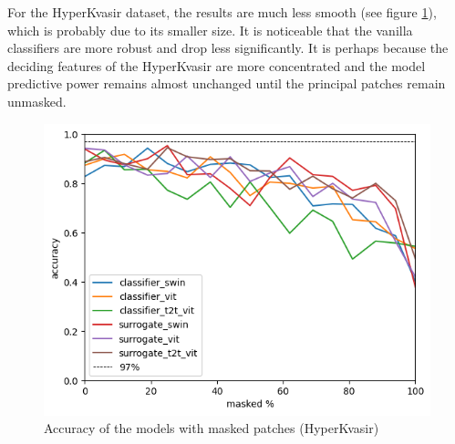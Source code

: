 \documentclass[magisterska,en]{pracamgr}
\begin{document}
For the HyperKvasir dataset, the results are much less smooth (see figure \ref{gastro_masked_accuracy}), which is probably due to its smaller size. It is noticeable that the vanilla classifiers are more robust and drop less significantly. It is perhaps because the deciding features of the HyperKvasir are more concentrated and the model predictive power remains almost unchanged until the principal patches remain unmasked.

\begin{figure}[H]
\centering
\includegraphics[scale=0.8]{./images/gastro_masked_accuracy.png}
\caption{Accuracy of the models with masked patches (HyperKvasir)}
\label{gastro_masked_accuracy}
\end{figure}
\end{document}
